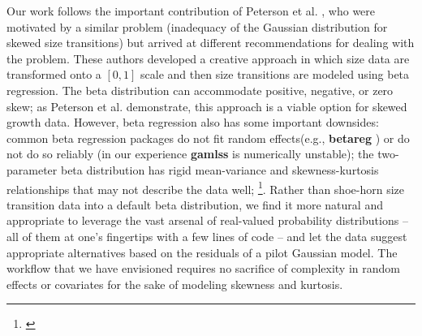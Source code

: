 \documentclass[12pt]{article}
\newcommand{\tom}[2]{{\color{red}{#1}}\footnote{\textit{\color{red}{#2}}}}
\begin{document}
Our work follows the important contribution of Peterson et al. \citeyear{peterson2019improving}, who were motivated by a similar problem (inadequacy of the Gaussian distribution for skewed size transitions) but arrived at different recommendations for dealing with the problem. 
These authors developed a creative approach in which size data are transformed onto a $[0,1]$ scale and then size transitions are modeled using beta regression. 
The beta distribution can accommodate positive, negative, or zero skew; as Peterson et al. demonstrate, this approach is a viable option for skewed growth data. 
However, beta regression also has some important downsides: common beta regression packages do not fit random effects(e.g., \textbf{betareg} \citep{cribari2010beta}) or do not do so reliably (in our experience \textbf{gamlss} is numerically unstable); the two-parameter beta distribution has rigid mean-variance and skewness-kurtosis relationships that may not describe the data well; \tom{and}{Steve, I recall you have a beef with transformation to [0,1], so that would go here.}. 
Rather than shoe-horn size transition data into a default beta distribution, we find it more natural and appropriate to leverage the vast arsenal of real-valued probability distributions -- all of them at one's fingertips with a few lines of code -- and let the data suggest appropriate alternatives based on the residuals of a pilot Gaussian model. 
The workflow that we have envisioned requires no sacrifice of complexity in random effects or covariates for the sake of modeling skewness and kurtosis. 
\end{document}
